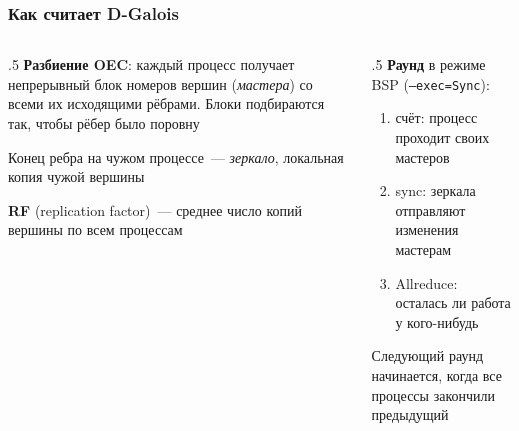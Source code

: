 \documentclass
  [ russian
  , aspectratio=1610
  ] {beamer}
\begin{document}
\begin{frame}
    \frametitle{Как считает D-Galois}
    \begin{columns}[T]
        \begin{column}{.5\textwidth}
            \textbf{Разбиение OEC}: каждый процесс получает непрерывный блок номеров вершин
            (\emph{мастера}) со всеми их исходящими рёбрами. Блоки подбираются так, чтобы рёбер
            было поровну

            \medskip
            Конец ребра на чужом процессе~--- \emph{зеркало}, локальная копия чужой вершины

            \medskip
            \textbf{RF} (replication factor)~--- среднее число копий вершины по всем процессам
        \end{column}
        \begin{column}{.5\textwidth}
            \textbf{Раунд} в режиме BSP (\texttt{--exec=Sync}):
            \begin{enumerate}
                \item счёт: процесс проходит своих мастеров
                \item sync: зеркала отправляют изменения мастерам
                \item Allreduce: осталась ли работа у кого-нибудь
            \end{enumerate}

            \medskip
            Следующий раунд начинается, когда все процессы закончили предыдущий
        \end{column}
    \end{columns}
\end{frame}
\end{document}
